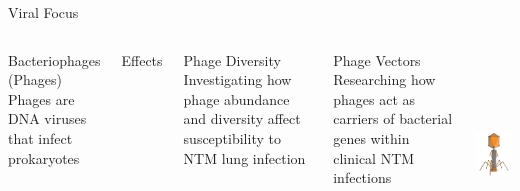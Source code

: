 \documentclass[11pt, xcolor=table]{beamer}
\begin{document}
	
	\begin{frame}{Viral Focus}
	\begin{columns}
	\begin{block}{Bacteriophages (Phages)}
	Phages are DNA viruses that infect prokaryotes
	\end{block}
	
	Effects
	
	\begin{block}{Phage Diversity}
	Investigating how phage abundance and diversity affect susceptibility to NTM lung infection
	\end{block}
	
	\begin{block}{Phage Vectors}
	Researching how phages act as carriers of bacterial genes within clinical NTM infections
	\end{block}
	
	
	\includegraphics[height=5.5cm, width=5cm]{phage.png} \\
	\end{columns}
	
	
	\end{frame}
\end{document}
